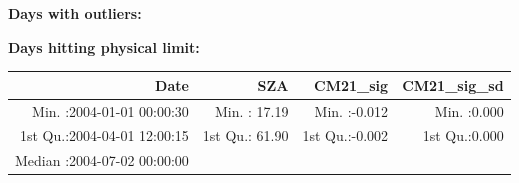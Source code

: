 \documentclass[
  10pt,
  a4paper,oneside]{article}
\begin{document}
\normalsize

\textbf{Days with outliers:}

\textbf{Days hitting physical limit:}

\footnotesize

\begin{longtable}[]{@{}rrrr@{}}
\toprule
\begin{minipage}[b]{0.33\columnwidth}\raggedleft
Date\strut
\end{minipage} & \begin{minipage}[b]{0.19\columnwidth}\raggedleft
SZA\strut
\end{minipage} & \begin{minipage}[b]{0.19\columnwidth}\raggedleft
CM21\_sig\strut
\end{minipage} & \begin{minipage}[b]{0.19\columnwidth}\raggedleft
CM21\_sig\_sd\strut
\end{minipage}\tabularnewline
\midrule
\endhead
\begin{minipage}[t]{0.33\columnwidth}\raggedleft
Min. :2004-01-01 00:00:30\strut
\end{minipage} & \begin{minipage}[t]{0.19\columnwidth}\raggedleft
Min. : 17.19\strut
\end{minipage} & \begin{minipage}[t]{0.19\columnwidth}\raggedleft
Min. :-0.012\strut
\end{minipage} & \begin{minipage}[t]{0.19\columnwidth}\raggedleft
Min. :0.000\strut
\end{minipage}\tabularnewline
\begin{minipage}[t]{0.33\columnwidth}\raggedleft
1st Qu.:2004-04-01 12:00:15\strut
\end{minipage} & \begin{minipage}[t]{0.19\columnwidth}\raggedleft
1st Qu.: 61.90\strut
\end{minipage} & \begin{minipage}[t]{0.19\columnwidth}\raggedleft
1st Qu.:-0.002\strut
\end{minipage} & \begin{minipage}[t]{0.19\columnwidth}\raggedleft
1st Qu.:0.000\strut
\end{minipage}\tabularnewline
\begin{minipage}[t]{0.33\columnwidth}\raggedleft
Median :2004-07-02 00:00:00\strut
\end{minipage} & \begin{minipage}[t]{0.19\columnwidth}\raggedleft

\end{minipage}
\end{longtable}
\end{document}
